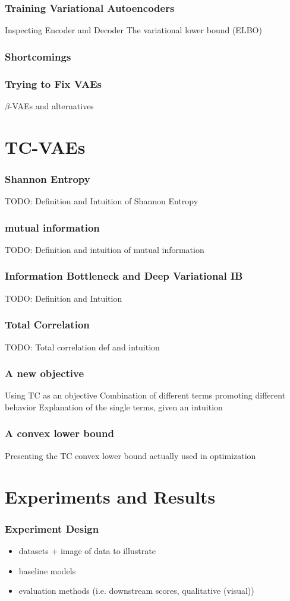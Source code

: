 \documentclass{beamer}
\theoremstyle{definition}
\begin{document}
    \begin{frame}
      \frametitle{Training Variational Autoencoders}
      Inspecting Encoder and Decoder
      The variational lower bound (ELBO)
    \end{frame}

    \begin{frame}
      \frametitle{Shortcomings}
    \end{frame}

    \begin{frame}
      \frametitle{Trying to Fix VAEs}
      $\beta$-VAEs and alternatives
    \end{frame}


  \section{TC-VAEs}

    \begin{frame}
      \frametitle{Shannon Entropy}
      TODO: Definition and Intuition of Shannon Entropy
    \end{frame}

    \begin{frame}
      \frametitle{mutual information}
      TODO: Definition and intuition of mutual information
    \end{frame}

    \begin{frame}
      \frametitle{Information Bottleneck and Deep Variational IB}
      TODO: Definition and Intuition
    \end{frame}

    \begin{frame}
      \frametitle{Total Correlation}
      TODO: Total correlation def and intuition
    \end{frame}

    \begin{frame}
      \frametitle{A new objective}
      Using TC as an objective
      Combination of different terms promoting different behavior
      Explanation of the single terms, given an intuition
    \end{frame}

    \begin{frame}
      \frametitle{A convex lower bound}
      Presenting the TC convex lower bound actually used in optimization
    \end{frame}


  \section{Experiments and Results}
    \begin{frame}
      \frametitle{Experiment Design}
      \begin{itemize}
        \item datasets + image of data to illustrate
        \item baseline models
        \item evaluation methods (i.e. downstream scores, qualitative (visual))
      \end{itemize}
    \end{frame}
\end{document}
